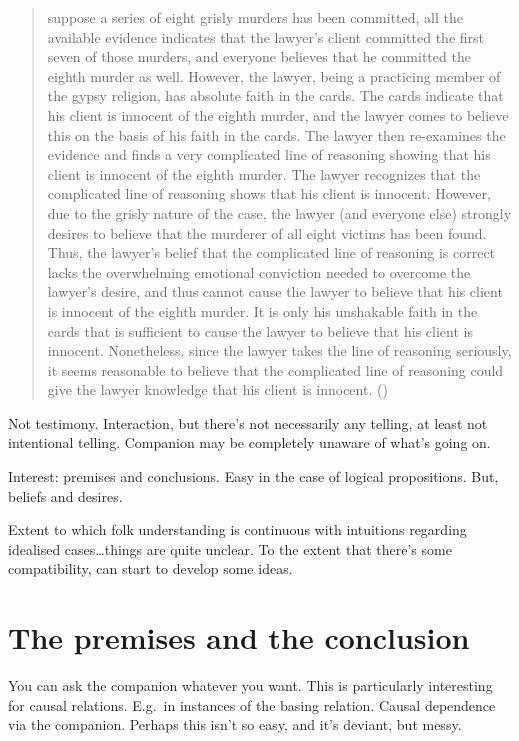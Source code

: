\documentclass[10pt]{article}
\begin{document}
\begin{quote}
  suppose a series of eight grisly murders has been committed, all the available evidence indicates that the lawyer’s client committed the first seven of those murders, and everyone believes that he committed the eighth murder as well. However, the lawyer, being a practicing member of the gypsy religion, has absolute faith in the cards. The cards indicate that his client is innocent of the eighth murder, and the lawyer comes to believe this on the basis of his faith in the cards. The lawyer then re-examines the evidence and finds a very complicated line of reasoning showing that his client is innocent of the eighth murder. The lawyer recognizes that the complicated line of reasoning shows that his client is innocent. However, due to the grisly nature of the case, the lawyer (and everyone else) strongly desires to believe that the murderer of all eight victims has been found. Thus, the lawyer’s belief that the complicated line of reasoning is correct lacks the overwhelming emotional conviction needed to
  overcome the lawyer’s desire, and thus cannot cause the lawyer to believe that his client is innocent of the eighth murder. It is only his unshakable faith in the cards that is sufficient to cause the lawyer to believe that his client is innocent. Nonetheless, since the lawyer takes the line of reasoning seriously, it seems reasonable to believe that the complicated line of reasoning could give the lawyer knowledge that his client is innocent.\nolinebreak
  \mbox{}\hfill\mbox{(\citeyear{Korcz:2019aa})}
\end{quote}

\newpage

Not testimony.
Interaction, but there's not necessarily any telling, at least not intentional telling.
Companion may be completely unaware of what's going on.


Interest: premises and conclusions.
Easy in the case of logical propositions.
But, beliefs and desires.

Extent to which folk understanding is continuous with intuitions regarding idealised cases\dots things are quite unclear.
To the extent that there's some compatibility, can start to develop some ideas.

\section{The premises and the conclusion}
\label{sec:premises-conclusion}

You can ask the companion whatever you want.
This is particularly interesting for causal relations.
E.g.\ in instances of the basing relation.
Causal dependence via the companion.
Perhaps this isn't so easy, and it's deviant, but messy.
\end{document}

